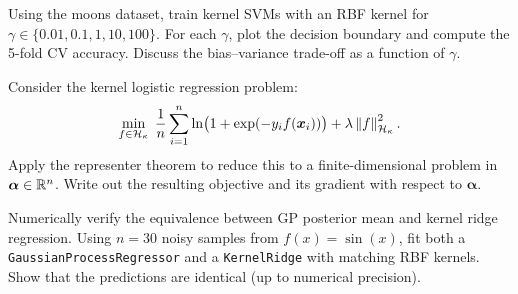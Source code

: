 \begin{exercise}
Using the moons dataset, train kernel SVMs with an RBF kernel for $\gamma\in\{0.01, 0.1, 1, 10, 100\}$. For each $\gamma$, plot the decision boundary and compute the 5-fold CV accuracy. Discuss the bias--variance trade-off as a function of $\gamma$.
\end{exercise}

\begin{exercise}
Consider the kernel logistic regression problem:
\[
  \min_{f\in\mathcal{H}_\kappa}\;\frac{1}{n}\sum_{i=1}^n\ln\bigl(1+\exp(-y_i f(\bm{x}_i))\bigr)+\lambda\left\| f \right\|^2_{\mathcal{H}_\kappa}.
\]
Apply the representer theorem to reduce this to a finite-dimensional problem in $\bm{\alpha}\in\mathbb{R}^n$. Write out the resulting objective and its gradient with respect to $\bm{\alpha}$.
\end{exercise}

\begin{exercise}
Numerically verify the equivalence between GP posterior mean and kernel ridge regression. Using $n=30$ noisy samples from $f(x)=\sin(x)$, fit both a \texttt{GaussianProcessRegressor} and a \texttt{KernelRidge} with matching RBF kernels. Show that the predictions are identical (up to numerical precision).
\end{exercise}
